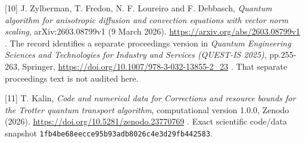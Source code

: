\begin{samepage}
{[}10{]} J. Zylberman, T. Fredon, N. F. Loureiro and F. Debbasch,
\emph{Quantum algorithm for anisotropic diffusion and convection
equations with vector norm scaling}, arXiv:2603.08799v1 (9 March 2026).
\url{https://arxiv.org/abs/2603.08799v1} . The record identifies a
separate proceedings version in \emph{Quantum Engineering Sciences and
Technologies for Industry and Services (QUEST-IS 2025)}, pp.255-263,
Springer, \url{https://doi.org/10.1007/978-3-032-13855-2_23} . That
separate proceedings text is not audited here.
\end{samepage}

\begin{samepage}
{[}11{]} T. Kalin, \emph{Code and numerical data for Corrections and
resource bounds for the Trotter quantum transport algorithm},
computational version 1.0.0, Zenodo (2026).
\url{https://doi.org/10.5281/zenodo.23770769} . Exact scientific
code/data snapshot \nolinkurl{1fb4be68eecce95b93adb8026c4e3d29fb442583}.
\end{samepage}
\endgroup
